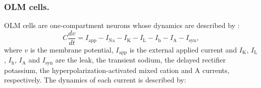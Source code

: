 \documentclass[../main.tex]{subfiles}
\begin{document}
\subsubsection{OLM cells.}
OLM cells are one-compartment neurons whose dynamics are described by 
\citep{neymotin_ketamine_2011,neymotin_ih_2013,Tort2007}:
\begin{equation}
    C\displaystyle\frac{dv}{dt} = I_{\text{app}}-I_{\text{Na}} - I_{\text{K}} - I_{\text{L}} -I_{\text{h}} -I_{\text{A}} -I_{\text{syn}},
    \label{eq:olm-dynamics}
\end{equation}
where $v$ is the membrane potential, $I_{\text{app}}$ is the external applied current and $I_{\text{K}}$, $I_{\text{L}}$, $I_{\text{h}}$, $I_{\text{A}}$ and $I_{\text{syn}}$ are the leak, the transient sodium, the delayed rectifier potassium, the hyperpolarization-activated mixed cation and A currents, respectively.
The dynamics of each current is described by:
\end{document}
